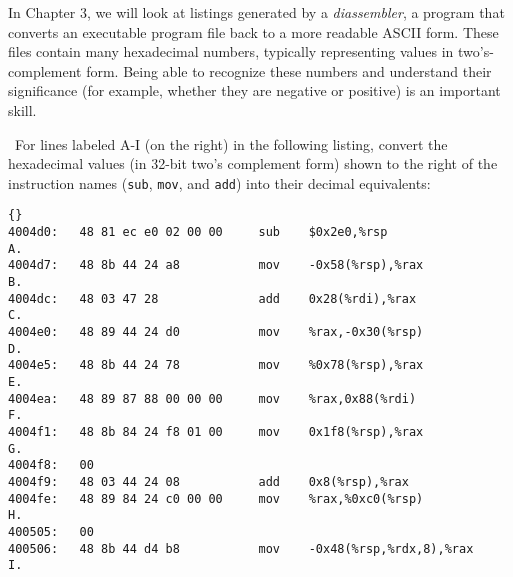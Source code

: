 \documentclass[12pt]{article}
\newenvironment{ex}[2][Exercise]{\begin{trivlist}
		\item[\hskip \labelsep {\bfseries #1}\hskip \labelsep {\bfseries #2.}]}{\end{trivlist}}
\begin{document}
\begin{ex}{2.18}
	In Chapter 3, we will look at listings generated by a \emph{diassembler}, a program that
	converts an executable program file back to a more readable ASCII form. These
	files contain many hexadecimal numbers, typically representing values in two's-complement
	form. Being able to recognize these numbers and understand their significance
	(for example, whether they are negative or positive) is an important skill.
	
	\
	\noindent For lines labeled A-I (on the right) in the following listing, convert the
	hexadecimal values (in 32-bit two's complement form) shown to the right of the
	instruction names (\texttt{sub}, \texttt{mov}, and \texttt{add}) into their decimal
	equivalents:
	\begin{lstlisting}{}
4004d0:   48 81 ec e0 02 00 00     sub    $0x2e0,%rsp                 A.
4004d7:   48 8b 44 24 a8           mov    -0x58(%rsp),%rax            B.
4004dc:   48 03 47 28              add    0x28(%rdi),%rax             C.
4004e0:   48 89 44 24 d0           mov    %rax,-0x30(%rsp)            D.
4004e5:   48 8b 44 24 78           mov    %0x78(%rsp),%rax            E.
4004ea:   48 89 87 88 00 00 00     mov    %rax,0x88(%rdi)             F.
4004f1:   48 8b 84 24 f8 01 00     mov    0x1f8(%rsp),%rax            G.
4004f8:   00
4004f9:   48 03 44 24 08           add    0x8(%rsp),%rax
4004fe:   48 89 84 24 c0 00 00     mov    %rax,%0xc0(%rsp)            H.
400505:   00
400506:   48 8b 44 d4 b8           mov    -0x48(%rsp,%rdx,8),%rax     I.
	\end{lstlisting}
\end{ex}
\end{document}

